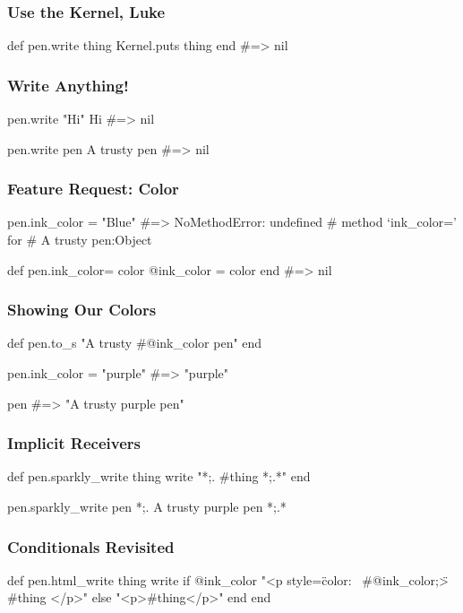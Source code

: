 \documentclass[20pt]{beamer}
\begin{document}
\begin{frame}[fragile]
\frametitle{Use the Kernel, Luke}
\begin{rubycode}
def pen.write thing
  Kernel.puts thing
end
#=> nil
\end{rubycode}
\end{frame}

\begin{frame}[fragile]
\frametitle{Write Anything!}
\begin{rubycode}
pen.write "Hi"
Hi
#=> nil

pen.write pen
A trusty pen
#=> nil
\end{rubycode}
\end{frame}

\begin{frame}[fragile]
\frametitle{Feature Request: Color}
\begin{rubycode}
pen.ink_color = "Blue"
#=> NoMethodError: undefined
# method `ink_color=' for
# A trusty pen:Object

def pen.ink_color= color
  @ink_color = color
end
#=> nil
\end{rubycode}
\end{frame}

\begin{frame}[fragile]
\frametitle{Showing Our Colors}
\begin{rubycode}
def pen.to_s
  "A trusty #{@ink_color} pen"
end

pen.ink_color = "purple"
#=> "purple"

pen
#=> "A trusty purple pen"
\end{rubycode}
\end{frame}

\begin{frame}[fragile]
\frametitle{Implicit Receivers}
\begin{rubycode}
def pen.sparkly_write thing
  write "*;. #{thing} *;.*"
end

pen.sparkly_write pen
*;. A trusty purple pen *;.*
\end{rubycode}
\end{frame}

\begin{frame}[fragile]
\frametitle{Conditionals Revisited}
\begin{rubycode}
def pen.html_write thing
  write if @ink_color
    "<p style=\"color: \
    #{@ink_color};\">
      #{thing}
    </p>"
  else
    "<p>#{thing}</p>"
  end
end
\end{rubycode}
\end{frame}
\end{document}
